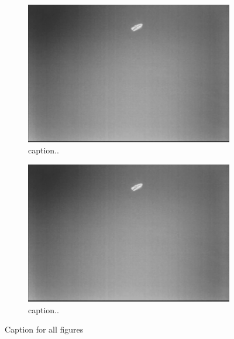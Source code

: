 \begin{figure}[ht]
\begin{subfigure}[b]{0.45\textwidth}
		\includegraphics[width=\textwidth]{assignment_1/rapport/figures/fig1}
		\caption{caption..}
		\label{fig:2c}
	\end{subfigure}
	\begin{subfigure}[b]{0.45\textwidth}
		\includegraphics[width=\textwidth]{assignment_1/rapport/figures/fig1}
		\caption{caption..}
		\label{fig:2d}
	\end{subfigure}		
	\caption{Caption for all figures}\label{fig:2}
\end{figure}